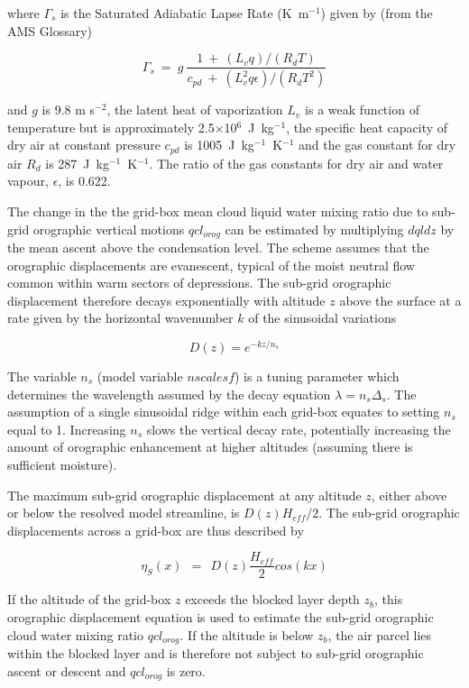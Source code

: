 \documentclass{UMDP_article}
\begin{document}
where $\Gamma_s$ is the Saturated Adiabatic Lapse Rate (K~m$^{-1}$) given by (from the AMS Glossary)

\begin{equation} 
\Gamma_s  ~=~ g ~ \frac{ 1 ~+~ (L_v q)/(R_d T) }  
    { c_{pd} ~+~ (L_v^2 q \epsilon)/(R_d T^2) }
\end{equation}

and $g$ is 9.8 m s$^{-2}$,  the latent heat of vaporization $L_v$ is a weak function of temperature but is approximately 2.5$\times$10$^6$~J~kg$^{-1}$, the specific heat capacity of dry air at constant pressure $c_{pd}$ is 1005~J~kg$^{-1}$~K$^{-1}$  and the gas constant for dry air $R_d$ is 287~J~kg$^{-1}$~K$^{-1}$. The ratio of the gas constants for dry air and water vapour, $\epsilon$, is 0.622.  

The change in the the grid-box mean cloud liquid water mixing ratio due to sub-grid orographic vertical motions $qcl_{orog}$ can be estimated by multiplying $dqldz$ by the mean ascent above the condensation level.  
The scheme assumes that the orographic displacements are evanescent, typical of the moist neutral flow common within warm sectors of depressions.  The sub-grid orographic displacement therefore decays exponentially with altitude $z$ above the surface at a rate given by the horizontal wavenumber $k$ of the sinusoidal variations

\begin{equation} 
D(z) = e^{-k z / n_s}
\end{equation}

The variable $n_s$ (model variable $nscalesf$) is a tuning parameter which determines the wavelength assumed by the 
decay equation $\lambda = n_s \Delta_s$.  The assumption of a single sinusoidal ridge within each grid-box equates to setting $n_s$ equal to 1.  Increasing $n_s$ slows the vertical decay rate, potentially increasing the amount of orographic enhancement at higher altitudes (assuming there is sufficient moisture).  

The maximum sub-grid orographic displacement at any altitude $z$, either above or below the resolved model streamline, is $D(z) H_{eff} / 2$.  The sub-grid orographic displacements across a grid-box are thus described by

\begin{equation} 
\eta_{S}(x) ~~=~~  D(z) \frac{H_{eff}}{2} cos(kx)
\end{equation}

If the altitude of the grid-box $z$ exceeds the blocked layer depth $z_b$, this orographic displacement equation is used to estimate the sub-grid orographic cloud water mixing ratio $qcl_{orog}$.  
If the altitude is below $z_b$, the air parcel lies within the blocked layer and is therefore not subject to sub-grid orographic ascent or descent and $qcl_{orog}$ is zero.  
\end{document}
